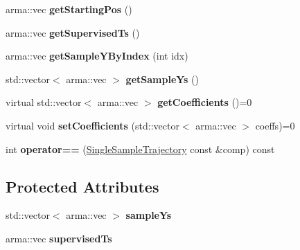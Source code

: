 \begin{DoxyCompactItemize}
\item 
\hypertarget{classkukadu_1_1SingleSampleTrajectory_afac3c5f483c8d603c695b9d393b77c38}{arma\-::vec {\bfseries get\-Starting\-Pos} ()}\label{classkukadu_1_1SingleSampleTrajectory_afac3c5f483c8d603c695b9d393b77c38}

\item 
\hypertarget{classkukadu_1_1SingleSampleTrajectory_a545217d83c817424ce99d81698c16e04}{arma\-::vec {\bfseries get\-Supervised\-Ts} ()}\label{classkukadu_1_1SingleSampleTrajectory_a545217d83c817424ce99d81698c16e04}

\item 
\hypertarget{classkukadu_1_1SingleSampleTrajectory_a1c6479b4988152cbc061e2bcbfc7280c}{arma\-::vec {\bfseries get\-Sample\-Y\-By\-Index} (int idx)}\label{classkukadu_1_1SingleSampleTrajectory_a1c6479b4988152cbc061e2bcbfc7280c}

\item 
\hypertarget{classkukadu_1_1SingleSampleTrajectory_ae36a0fe9502a898edc8bab4427b9ce6d}{std\-::vector$<$ arma\-::vec $>$ {\bfseries get\-Sample\-Ys} ()}\label{classkukadu_1_1SingleSampleTrajectory_ae36a0fe9502a898edc8bab4427b9ce6d}

\item 
\hypertarget{classkukadu_1_1SingleSampleTrajectory_a3dfb670c00d9034c5a867be3801845fa}{virtual std\-::vector$<$ arma\-::vec $>$ {\bfseries get\-Coefficients} ()=0}\label{classkukadu_1_1SingleSampleTrajectory_a3dfb670c00d9034c5a867be3801845fa}

\item 
\hypertarget{classkukadu_1_1SingleSampleTrajectory_a02d1a2cc8835c05d0d882bf82c0cd409}{virtual void {\bfseries set\-Coefficients} (std\-::vector$<$ arma\-::vec $>$ coeffs)=0}\label{classkukadu_1_1SingleSampleTrajectory_a02d1a2cc8835c05d0d882bf82c0cd409}

\item 
\hypertarget{classkukadu_1_1SingleSampleTrajectory_acb02e8fec6bd44e65e9eaae3974a3f55}{int {\bfseries operator==} (\hyperlink{classkukadu_1_1SingleSampleTrajectory}{Single\-Sample\-Trajectory} const \&comp) const }\label{classkukadu_1_1SingleSampleTrajectory_acb02e8fec6bd44e65e9eaae3974a3f55}

\end{DoxyCompactItemize}
\subsection*{Protected Attributes}
\begin{DoxyCompactItemize}
\item 
\hypertarget{classkukadu_1_1SingleSampleTrajectory_aab36dde449f47b0fa528bc823abef1aa}{std\-::vector$<$ arma\-::vec $>$ {\bfseries sample\-Ys}}\label{classkukadu_1_1SingleSampleTrajectory_aab36dde449f47b0fa528bc823abef1aa}

\item 
\hypertarget{classkukadu_1_1SingleSampleTrajectory_a645432edcf7f9e23571710ba0f96cfb2}{arma\-::vec {\bfseries supervised\-Ts}}\label{classkukadu_1_1SingleSampleTrajectory_a645432edcf7f9e23571710ba0f96cfb2}

\end{DoxyCompactItemize}


